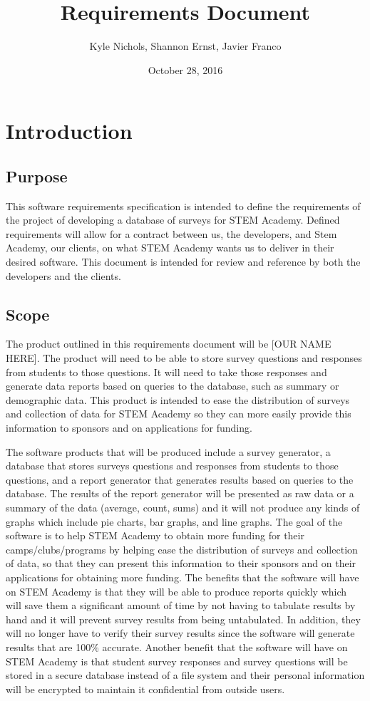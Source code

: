 \documentclass[letterpaper,10pt,titlepage, draftclsnofoot,onecolumn]{IEEEtran}
\begin{document}
\title{Requirements Document}
\author{Kyle Nichols, Shannon Ernst, Javier Franco}
\date{October 28, 2016}
\maketitle
\section{Introduction}
\subsection{Purpose}
This software requirements specification is intended to define the requirements of the project of developing a database 
of surveys for STEM Academy. Defined requirements will allow for a contract between us, the developers, and Stem Academy, 
our clients, on what STEM Academy wants us to deliver in their desired software. This document is intended for review and
reference by both the developers and the clients.
\subsection{Scope}
The product outlined in this requirements document will be [OUR NAME HERE]. The product will need to be able to store survey
questions and responses from students to those questions. It will need to take those responses and generate data reports
based on queries to the database, such as summary or demographic data. This product is intended to ease the distribution of
surveys and collection of data for STEM Academy so they can more easily provide this information to sponsors and on
applications for funding. %

The software products that will be produced include a survey generator, a database that stores surveys questions and responses from students to those questions, and a report generator that generates results based on queries to the database.  
The results of the report generator will be presented as raw data or a summary of the data (average, count, sums) and it will not produce any kinds of graphs which include pie charts, bar graphs, and line graphs.  
The goal of the software is to help STEM Academy to obtain more funding for their camps/clubs/programs by helping ease the distribution of surveys and collection of data, so that they can present this information to their sponsors and on their applications for obtaining more funding. 
The benefits that the software will have on STEM Academy is that they will be able to produce reports quickly which will save them a significant amount of time by not having to tabulate results by hand and it will prevent survey results from being untabulated.
 In addition, they will no longer have to verify their survey results since the software will generate results that are 100\% accurate.
 Another benefit that the software will have on STEM Academy is that student survey responses and survey questions will be stored in a secure database instead of a file system and their personal information will be encrypted to maintain it confidential from outside users. 
\end{document}
